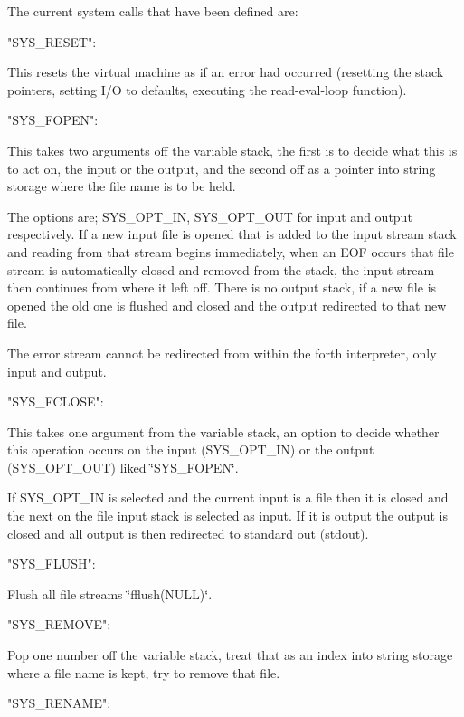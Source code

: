 The current system calls that have been defined are\-: \begin{DoxyVerb}   "SYS_RESET":
\end{DoxyVerb}


This resets the virtual machine as if an error had occurred (resetting the stack pointers, setting I/\-O to defaults, executing the read-\/eval-\/loop function). \begin{DoxyVerb}   "SYS_FOPEN":
\end{DoxyVerb}


This takes two arguments off the variable stack, the first is to decide what this is to act on, the input or the output, and the second off as a pointer into string storage where the file name is to be held.

The options are; S\-Y\-S\-\_\-\-O\-P\-T\-\_\-\-I\-N, S\-Y\-S\-\_\-\-O\-P\-T\-\_\-\-O\-U\-T for input and output respectively. If a new input file is opened that is added to the input stream stack and reading from that stream begins immediately, when an E\-O\-F occurs that file stream is automatically closed and removed from the stack, the input stream then continues from where it left off. There is no output stack, if a new file is opened the old one is flushed and closed and the output redirected to that new file.

The error stream cannot be redirected from within the forth interpreter, only input and output. \begin{DoxyVerb}   "SYS_FCLOSE":
\end{DoxyVerb}


This takes one argument from the variable stack, an option to decide whether this operation occurs on the input (S\-Y\-S\-\_\-\-O\-P\-T\-\_\-\-I\-N) or the output (S\-Y\-S\-\_\-\-O\-P\-T\-\_\-\-O\-U\-T) liked \char`\"{}\-S\-Y\-S\-\_\-\-F\-O\-P\-E\-N\char`\"{}.

If S\-Y\-S\-\_\-\-O\-P\-T\-\_\-\-I\-N is selected and the current input is a file then it is closed and the next on the file input stack is selected as input. If it is output the output is closed and all output is then redirected to standard out (stdout). \begin{DoxyVerb}   "SYS_FLUSH":
\end{DoxyVerb}


Flush all file streams \char`\"{}fflush(\-N\-U\-L\-L)\char`\"{}. \begin{DoxyVerb}   "SYS_REMOVE":
\end{DoxyVerb}


Pop one number off the variable stack, treat that as an index into string storage where a file name is kept, try to remove that file. \begin{DoxyVerb}   "SYS_RENAME":
\end{DoxyVerb}


